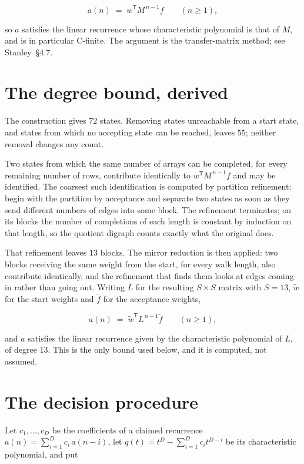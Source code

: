 \documentclass[11pt]{article}
\theoremstyle{definition}
\begin{document}
\[a(n) \;=\; w^{\mathsf T} M^{\,n-1} f \qquad (n \ge 1),\]

so $a$ satisfies the linear recurrence whose characteristic polynomial is that of $M$, and is in particular C-finite. The argument is the transfer-matrix method; see Stanley~\S4.7.

\section{The degree bound, derived}

The construction gives $72$ states. Removing states unreachable from a start state, and states from which no accepting state can be reached, leaves $55$; neither removal changes any count.

Two states from which the same number of arrays can be completed, for every remaining number of rows, contribute identically to $w^{\mathsf T}M^{\,n-1}f$ and may be identified. The coarsest such identification is computed by partition refinement: begin with the partition by acceptance and separate two states as soon as they send different numbers of edges into some block. The refinement terminates; on its blocks the number of completions of each length is constant by induction on that length, so the quotient digraph counts exactly what the original does.

That refinement leaves $13$ blocks. The mirror reduction is then applied: two blocks receiving the same weight from the start, for every walk length, also contribute identically, and the refinement that finds them looks at edges coming in rather than going out. Writing $L$ for the resulting $S \times S$ matrix with $S = 13$, $\tilde w$ for the start weights and $\tilde f$ for the acceptance weights,

\[a(n) \;=\; \tilde w^{\mathsf T} L^{\,n-1} \tilde f \qquad (n \ge 1),\]

and $a$ satisfies the linear recurrence given by the characteristic polynomial of $L$, of degree $13$. This is the only bound used below, and it is computed, not assumed.

\section{The decision procedure}

Let $c_1,\dots,c_D$ be the coefficients of a claimed recurrence $a(n) = \sum_{i=1}^{D} c_i\,a(n-i)$, let $q(t) = t^{D} - \sum_{i=1}^{D} c_i t^{D-i}$ be its characteristic polynomial, and put
\end{document}
